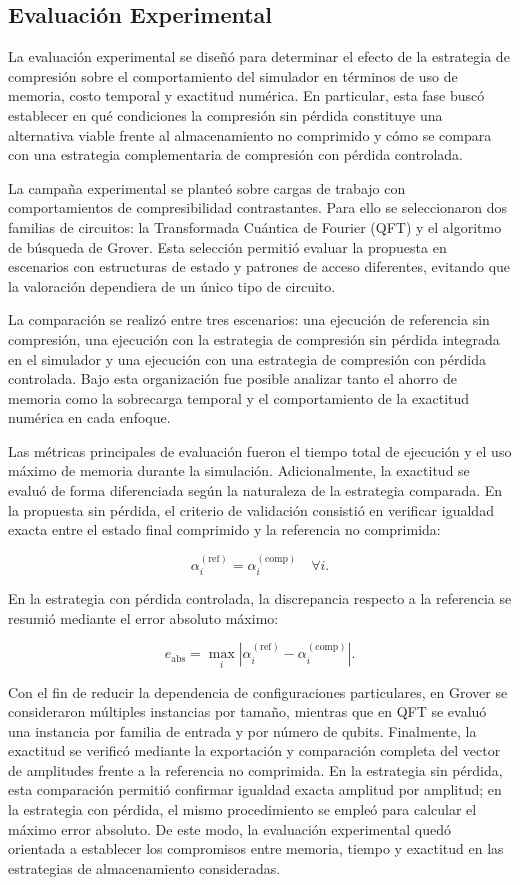 \subsection{Evaluación Experimental}

La evaluación experimental se diseñó para determinar el efecto de la estrategia de
compresión sobre el comportamiento del simulador en términos de uso de memoria,
costo temporal y exactitud numérica. En particular, esta fase buscó establecer en qué
condiciones la compresión sin pérdida constituye una alternativa viable frente al
almacenamiento no comprimido y cómo se compara con una estrategia complementaria
de compresión con pérdida controlada.

La campaña experimental se planteó sobre cargas de trabajo con comportamientos de
compresibilidad contrastantes. Para ello se seleccionaron dos familias de circuitos: la
Transformada Cuántica de Fourier (QFT) y el algoritmo de búsqueda de Grover. Esta
selección permitió evaluar la propuesta en escenarios con estructuras de estado y
patrones de acceso diferentes, evitando que la valoración dependiera de un único tipo
de circuito.

La comparación se realizó entre tres escenarios: una ejecución de referencia sin
compresión, una ejecución con la estrategia de compresión sin pérdida integrada en el
simulador y una ejecución con una estrategia de compresión con pérdida controlada.
Bajo esta organización fue posible analizar tanto el ahorro de memoria como la
sobrecarga temporal y el comportamiento de la exactitud numérica en cada enfoque.

Las métricas principales de evaluación fueron el tiempo total de ejecución y el uso
máximo de memoria durante la simulación. Adicionalmente, la exactitud se evaluó de
forma diferenciada según la naturaleza de la estrategia comparada. En la propuesta sin
pérdida, el criterio de validación consistió en verificar igualdad exacta entre el estado
final comprimido y la referencia no comprimida:

\[
\alpha_i^{(\text{ref})} = \alpha_i^{(\text{comp})} \quad \forall i.
\]

En la estrategia con pérdida controlada, la discrepancia respecto a la referencia se
resumió mediante el error absoluto máximo:

\[
e_{\text{abs}} = \max_i \left|\alpha_i^{(\text{ref})} - \alpha_i^{(\text{comp})}\right|.
\]

Con el fin de reducir la dependencia de configuraciones particulares, en Grover se
consideraron múltiples instancias por tamaño, mientras que en QFT se evaluó una
instancia por familia de entrada y por número de qubits. Finalmente, la exactitud se
verificó mediante la exportación y comparación completa del vector de amplitudes
frente a la referencia no comprimida. En la estrategia sin pérdida, esta comparación
permitió confirmar igualdad exacta amplitud por amplitud; en la estrategia con pérdida,
el mismo procedimiento se empleó para calcular el máximo error absoluto. De este
modo, la evaluación experimental quedó orientada a establecer los compromisos entre
memoria, tiempo y exactitud en las estrategias de almacenamiento consideradas.
